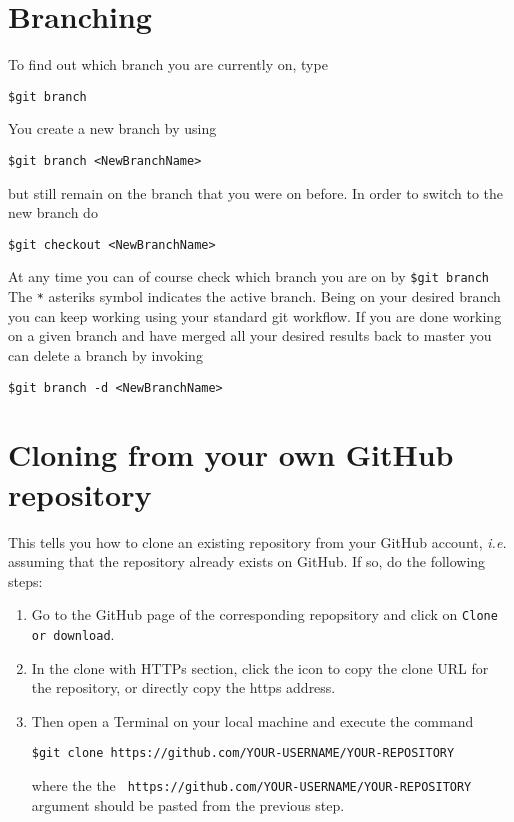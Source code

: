 \documentclass{article}
\begin{document}
\section{Branching}

To find out which branch you are currently on, type
\begin{lstlisting}
$git branch
\end{lstlisting}
You create a new branch by using
\begin{lstlisting}
$git branch <NewBranchName>
\end{lstlisting}
but still remain on the branch that you were on before. In order to switch to the new branch do
\begin{lstlisting}
$git checkout <NewBranchName>
\end{lstlisting}
At any time you can of course check which branch you are on by \verb|$git branch| The \verb|*| asteriks symbol indicates the active branch.
Being on your desired branch you can keep working using your standard git workflow.
If you are done working on a given branch and have merged all your desired results back to master you can delete a branch by invoking
\begin{lstlisting}
$git branch -d <NewBranchName>
\end{lstlisting}

\section{Cloning from your own GitHub repository}
This tells you how to clone an existing repository from your GitHub account,
\textit{i.e.} assuming that the repository already exists on GitHub.
If so, do the following steps:

\begin{enumerate}

	\item Go to the GitHub page of the corresponding repopsitory and click on \verb|Clone or download|.
	
	\item In the clone with HTTPs section, click the icon to copy the clone URL for the repository, or directly copy the https address. 
	
	\item Then open a Terminal on your local machine and execute the command
\begin{lstlisting}
$git clone https://github.com/YOUR-USERNAME/YOUR-REPOSITORY
\end{lstlisting}
	where the the \verb| https://github.com/YOUR-USERNAME/YOUR-REPOSITORY|
	argument should be pasted from the previous step.

\end{enumerate}
\end{document}
